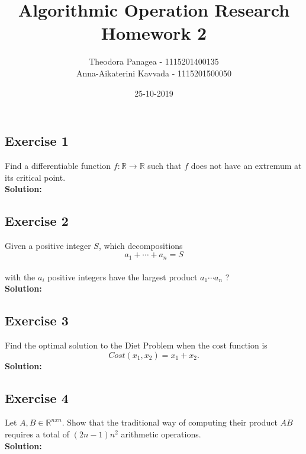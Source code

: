 \documentclass[12pt]{article}
\title{Algorithmic Operation Research \\ Homework 2}
\date{25-10-2019}
\author{Theodora Panagea - 1115201400135 \\ Anna-Aikaterini Kavvada - 1115201500050}
\newcommand{\R}{\mathbb{R}}
\begin{document}
	\maketitle{}
  	

\subsection*{Exercise 1}
Find a differentiable function $f: \R \rightarrow \R$ such that $f$ does not have an extremum at its critical point. \\
\textbf{Solution:} \par

\newpage


\subsection*{Exercise 2}
Given a positive integer $S$, which decompositions  \\
$$a_1+\cdots+a_n = S$$ \\
with the $a_i$ positive integers have the largest product $a_1 \cdots a_n$ ? \\
\textbf{Solution:} \par

\newpage


\subsection*{Exercise 3}
Find the optimal solution to the Diet Problem when the cost function is \\
$$Cost(x_1, x_2) = x_1 + x_2.$$
\textbf{Solution:} \par

\newpage


\subsection*{Exercise 4}
 Let $A, B \in \R^{nxn}$. Show that the traditional way of computing their product $AB$ requires a total of $(2n-1)n^2$ arithmetic operations.\\
\textbf{Solution:} \par
\end{document}
